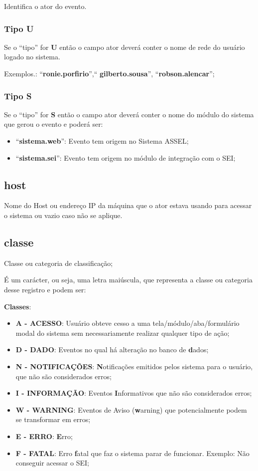 Identifica o ator do evento.

\subsubsection{Tipo U}

Se o ``tipo'' for \textbf{U} então o campo ator deverá conter o nome de rede do usuário logado no sistema.

Exemplos.: ``\textbf{ronie.porfirio}'',`` \textbf{gilberto.sousa}'', ``\textbf{robson.alencar}'';

\subsubsection{Tipo S}

Se o ``tipo'' for \textbf{S} então o campo ator deverá conter o nome do módulo do sistema que gerou o evento e poderá ser:

\begin{itemize}
	\item ``\textbf{sistema.web}'': Evento tem origem no Sistema ASSEL; 
	\item ``\textbf{sistema.sei}'': Evento tem origem no módulo de integração com o SEI; 
\end{itemize}


\subsection{host}

Nome do Host ou endereço IP da máquina que o ator estava usando para acessar o sistema ou vazio caso não se aplique.

\subsection{classe}

Classe ou categoria de classificação;

É um carácter, ou seja, uma letra maiúscula, que representa a classe ou categoria desse registro e podem ser:

\textbf{Classes}:
\begin{itemize}
	\item \textbf{A - ACESSO}: Usuário obteve cesso a uma tela/módulo/aba/formulário modal do sistema sem necessariamente realizar qualquer tipo de ação;
	\item \textbf{D - DADO}: Eventos no qual há alteração no banco de \textbf{d}ados;
	\item \textbf{N - NOTIFICAÇÕES}: \textbf{N}otificações emitidos pelos sistema para o usuário, que não são considerados erros;
	\item \textbf{I - INFORMAÇÃO}: Eventos \textbf{I}nformativos que não são considerados erros;
	\item \textbf{W - WARNING}: Eventos de Aviso (\textbf{w}arning) que potencialmente podem se transformar em erros;
	\item \textbf{E - ERRO}: \textbf{E}rro;
	\item \textbf{F - FATAL}: Erro \textbf{f}atal que faz o sistema parar de funcionar. Exemplo: Não conseguir acessar o SEI;
\end{itemize}

